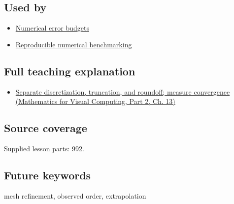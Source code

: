 \subsection{Used by}\label{appendix-aca80b6bf17a-used-by}

\hypertarget{appendix-aca80b6bf17a-used-by}{}

\begin{itemize}
\tightlist
\item
  \hyperref[appendix-31b8c295e05f]{Numerical error budgets}
\item
  \hyperref[appendix-b9db93e28371]{Reproducible numerical benchmarking}
\end{itemize}

\subsection{Full teaching explanation}\label{appendix-aca80b6bf17a-full-teaching-explanation}

\hypertarget{appendix-aca80b6bf17a-full-teaching-explanation}{}

\begin{itemize}
\tightlist
\item
  \href{../02-Mathematics-for-Visual-Computing-P02/main.pdf\#nameddest=02-foundations-ii-ch029-separate-discretization-truncation-and-roundoff-measure-convergence}{Separate discretization, truncation, and roundoff; measure convergence (Mathematics for Visual Computing, Part 2, Ch. 13)}
\end{itemize}

\subsection{Source coverage}\label{appendix-aca80b6bf17a-source-coverage}

\hypertarget{appendix-aca80b6bf17a-source-coverage}{}

Supplied lesson parts: 992.

\subsection{Future keywords}\label{appendix-aca80b6bf17a-future-keywords}

\hypertarget{appendix-aca80b6bf17a-future-keywords}{}

mesh refinement, observed order, extrapolation

